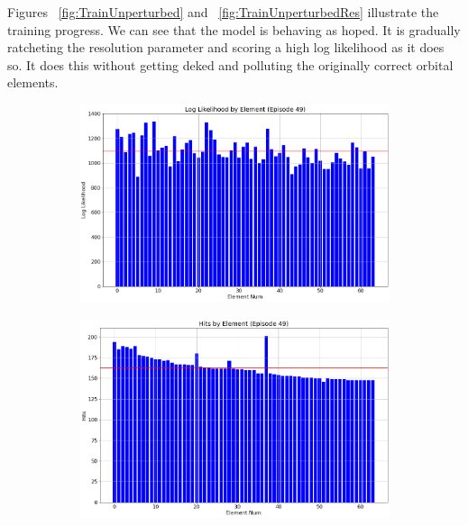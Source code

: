 Figures ~\ref{fig:TrainUnperturbed} and ~\ref{fig:TrainUnperturbedRes} illustrate the training progress.
We can see that the model is behaving as hoped.
It is gradually ratcheting the resolution parameter and scoring a high log likelihood as it does so.
It does this without getting deked and polluting the originally correct orbital elements.
\newcommand{\subfigwidth}{0.5}
\begin{figure}[h]
\begin{subfigure}[t]{\subfigwidth\textwidth}
\centering
\includegraphics[width=\linewidth]{../figs/search_known/unperturbed/log_like.png}
\end{subfigure}
\hfill
\begin{subfigure}[t]{\subfigwidth\textwidth}
\centering
\includegraphics[width=\linewidth]{../figs/search_known/unperturbed/hits.png}
\end{subfigure}
\medskip
\begin{subfigure}[t]{\subfigwidth\textwidth}

\end{subfigure}
\end{figure}
